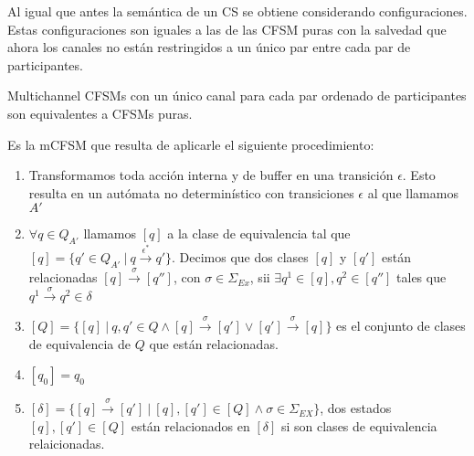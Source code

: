 Al igual que antes la semántica de un CS se obtiene considerando configuraciones. Estas configuraciones son iguales a las de las CFSM puras con la salvedad que ahora los canales no están restringidos a un único par entre cada par de participantes.

 

% 
% 

Multichannel CFSMs  con un único canal para cada par ordenado de participantes son equivalentes a CFSMs puras.

\begin{definition}\label{def:interfazAFCA} Es la mCFSM que resulta de aplicarle el siguiente procedimiento:
\begin{enumerate}
    \item Transformamos toda acción interna y de buffer en una transición $\epsilon$. Esto resulta en un autómata no determinístico con transiciones $\epsilon$ al que llamamos $A'$
    \item $\forall q \in Q_{A'}$ llamamos $[q]$ a la clase de equivalencia tal que $[q]=\{q' \in Q_{A'}\ |\ q \xrightarrow{\epsilon^*} q'\}$. Decimos que dos clases $[q]$ y $[q']$ están relacionadas $[q] \xrightarrow{\sigma} [q'']$, con $\sigma \in \Sigma_{Ex}$, sii $\exists q^1 \in [q], q^2 \in [q'']$ tales que $q^1 \xrightarrow{\sigma} q^2 \in \delta$
    \item $[Q]= \{[q] \ | \ q, q' \in Q \land [q] \xrightarrow{\sigma} [q'] \lor [q'] \xrightarrow{\sigma} [q] \}$ es el conjunto de clases de equivalencia de $Q$ que están relacionadas. 
    \item $[q_0]=q_0$
    \item $[\delta]= \{[q] \xrightarrow{\sigma} [q']\ |\ [q], [q'] \in [Q] \land \sigma \in \Sigma_{EX}\}$, dos estados $[q],[q'] \in [Q]$ están relacionados en $[\delta]$ si son clases de equivalencia relaicionadas. 
\end{enumerate}
\end{definition}

